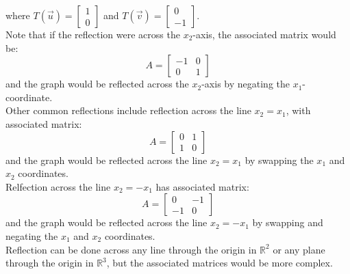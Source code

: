 \begin{eg}
\begin{center}
    \end{center}
    where $T(\vec{u}) = \begin{bmatrix} 1 \\ 0 \end{bmatrix}$ and $T(\vec{v}) = \begin{bmatrix} 0 \\ -1 \end{bmatrix}$. \\
    Note that if the reflection were across the $x_2$-axis, the associated matrix would be:
    \[
        A = \begin{bmatrix} -1 & 0 \\ 0 & 1 \end{bmatrix}
    \]
    and the graph would be reflected across the $x_2$-axis by negating the $x_1$-coordinate. \\
    Other common reflections include reflection across the line $x_2 = x_1$, with associated matrix:
    \[
        A = \begin{bmatrix} 0 & 1 \\ 1 & 0 \end{bmatrix}
    \]
    and the graph would be reflected across the line $x_2 = x_1$ by swapping the $x_1$ and $x_2$ coordinates. \\
    Relfection across the line $x_2 = -x_1$ has associated matrix:
    \[
        A = \begin{bmatrix} 0 & -1 \\ -1 & 0 \end{bmatrix}
    \]
    and the graph would be reflected across the line $x_2 = -x_1$ by swapping and negating the $x_1$ and $x_2$ coordinates. \\
    Reflection can be done across any line through the origin in $\mathbb{R}^2$ or any plane through the origin in $\mathbb{R}^3$, but the associated matrices would be more complex.
\end{eg}

